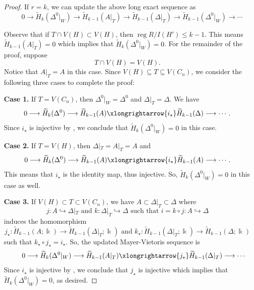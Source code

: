 \documentclass[12pt]{amsart}
\theoremstyle{plain}
\theoremstyle{definition}
\DeclareMathOperator{\reg}{reg}
\begin{document}
\begin{proof}
If $r=k$, we can update the above long exact sequence as
$$  ~~~~~~ 0 \longrightarrow \widetilde{H}_k (\Delta^0|_W) \longrightarrow \widetilde{H}_{k-1} (A|_T) \longrightarrow  \widetilde{H}_{k-1} (\Delta|_T)   \longrightarrow  \widetilde{H}_{k-1} (\Delta^0|_W)  \longrightarrow   \cdots$$

Observe that if $T \cap V(H) \subset V(H)$, then $\reg R/I(H') \leq k-1$. This means  $\widetilde{H}_{k-1} (A|_T)=0$ which implies that $\widetilde{H}_k (\Delta^0|_W)=0$.  For the remainder of the proof, suppose 
$$T \cap V(H) = V(H).$$ 
Notice that $A|_T=A$ in this case. Since $V(H) \subseteq T\subseteq V(C_n)$, we consider the following three cases to complete the proof:

\textbf{Case 1.} If $T=V(C_n)$, then $\Delta^0|_W=\Delta^0$ and $\Delta|_T=\Delta$. We have
    $$
    0 \longrightarrow \widetilde{H}_k (\Delta^0) \longrightarrow \widetilde{H}_{k-1} (A) \xlongrightarrow {i_{\star}}  \widetilde{H}_{k-1} (\Delta)   \longrightarrow \cdots.
    $$
Since $i_{\star}$ is injective by , we conclude that $\widetilde{H}_k (\Delta^0|_W)=0$ in this case.
    


\textbf{Case 2.} If $T=V(H)$, then $\Delta|_T=A|_T= A$ and
     $$
     0 \longrightarrow \widetilde{H}_k (\Delta^0) \longrightarrow \widetilde{H}_{k-1} (A) \xlongrightarrow {i_{\star}}  \widetilde{H}_{k-1} (A)   \longrightarrow \cdots.
    $$
This means that $i_{\star}$ is the identity map, thus injective. So, $\widetilde{H}_k (\Delta^0|_W)=0$ in this case as well.


\textbf{Case 3.} If $V(H) \subset T\subset V(C_n)$, we have  $A \subset \Delta|_T \subset \Delta$ where
\[
   j \colon A \hookrightarrow \Delta|_T \text{ and } k \colon \Delta|_T \hookrightarrow\Delta  \text{ such that }   i=k\circ j \colon A \hookrightarrow \Delta
\]
induces the homomorphism
\[
  j_{\star}: \widetilde H_{k-1}(A;\Bbbk) \longrightarrow \widetilde H_{k-1}(\Delta|_T;\Bbbk) \text{ and }  k_{\star}: \widetilde H_{k-1}(\Delta|_T;\Bbbk) \longrightarrow \widetilde H_{k-1}(\Delta;\Bbbk)
\]
such that  $k_{\star} \circ  j_{\star} = i_{\star}$. So, the updated Mayer-Vietoris sequence is    
    $$  ~~~~~~ 0 \longrightarrow \widetilde{H}_k (\Delta^0|_W) \longrightarrow \widetilde{H}_{k-1} (A|_T) \xlongrightarrow{j_{\star}}  \widetilde{H}_{k-1} (\Delta|_T)   \longrightarrow    \cdots$$
  Since $i_{\star}$ is injective by , we conclude that $j_{\star}$ is injective which implies that $\widetilde{H}_k (\Delta^0|_W)=0$, as desired. 
\end{proof}
\end{document}
